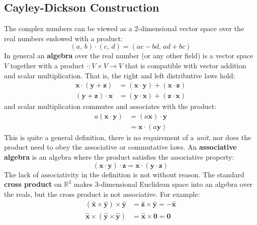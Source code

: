 \documentclass{article}
\theoremstyle{plain}
\theoremstyle{normal}
\begin{document}
        \subsection{Cayley-Dickson Construction}
            The complex numbers can be viewed as a 2-dimensional vector space
            over the real numbers endowed with a product:
            \begin{equation}
                (a,\,b)\cdot(c,\,d)=(ac-bd,\,ad+bc)
            \end{equation}
            In general an \textbf{algebra} over the real number (or any other
            field) is a vector space $V$ together with a product
            $\cdot:V\times{V}\rightarrow{V}$ that is compatible with vector
            addition and scalar multiplication. That is, the right and left
            distributive laws hold:
            \begin{align}
                \mathbf{x}\cdot(\mathbf{y}+\mathbf{z})
                &=(\mathbf{x}\cdot\mathbf{y})
                    +(\mathbf{x}\cdot\mathbf{z})\\
                (\mathbf{y}+\mathbf{z})\cdot\mathbf{x}
                &=(\mathbf{y}\cdot\mathbf{x})
                    +(\mathbf{z}\cdot\mathbf{x})
            \end{align}
            and scalar multiplication commutes and associates with the product:
            \begin{align}
                a(\mathbf{x}\cdot\mathbf{y})
                &=(a\mathbf{x})\cdot\mathbf{y}\\
                &=\mathbf{x}\cdot(a\mathbf{y})
            \end{align}
            This is quite a general definition, there is no requirement of a
            \textit{unit}, nor does the product need to obey the associative or
            commutative laws. An \textbf{associative algebra} is an algebra
            where the product satisfies the associative property:
            \begin{equation}
                (\mathbf{x}\cdot\mathbf{y})\cdot\mathbf{z}
                =\mathbf{x}\cdot(\mathbf{y}\cdot\mathbf{z})
            \end{equation}
            The lack of associativity in the definition is not without reason.
            The standard \textbf{cross product} on $\mathbb{R}^{3}$ makes
            3-dimensional Euclidean space into an algebra over the reals, but
            the cross product is not associative. For example:
            \begin{align}
                (\hat{\mathbf{x}}\times\hat{\mathbf{y}})\times\hat{\mathbf{y}}
                &=\hat{\mathbf{z}}\times\hat{\mathbf{y}}
                =-\hat{\mathbf{x}}\\
                \hat{\mathbf{x}}\times(\hat{\mathbf{y}}\times\hat{\mathbf{y}})
                &=\hat{\mathbf{x}}\times\mathbf{0}
                =\mathbf{0}
            \end{align}
\end{document}
